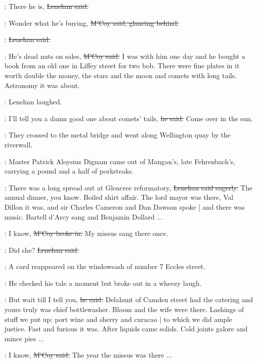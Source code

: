 \lenehan:
There he is,
\sout{Lenehan said.}

\mcoy:
Wonder what he's buying,
\sout{M'Coy said,
glancing behind.}

\lenehan:
\sout{Lenehan said.}

\mcoy:
He's dead nuts on sales,
\sout{M'Coy said.}
I was with him one day
and he bought a book 
from an old one in Liffey street for two bob.
There were fine plates in it worth double the money,
the stars and the moon and comets with long tails.
Astronomy it was about.

:
Lenehan laughed.

\lenehan:
I'll tell you a damn good one about comets' tails,
\sout{he said.}
Come over in the sun.

:
They crossed to the metal bridge
and went along Wellington quay by the riverwall.

\begin{mdframed}
    :
    Master Patrick Aloysius Dignam came out of Mangan's,
    late Fehrenbach's,
    carrying a pound and a half of porksteaks.
\end{mdframed}

\lenehan:
There was a long spread out at Glencree reformatory,
\sout{Lenehan said eagerly.}
The annual dinner, you know.
Boiled shirt affair.
The lord mayor was there,
Val Dillon it was,
and sir Charles Cameron and Dan Dawson spoke |
and there was music.
Bartell d'Arcy sang and Benjamin Dollard ...

\mcoy:
I know,
\sout{M'Coy broke in.}
My missus sang there once.

\lenehan:
Did she?
\sout{Lenehan said.}

\begin{mdframed}
    :
    A card  reappeared
    on the windowsash of number 7 Eccles street.
\end{mdframed}

:
He checked his tale a moment
but broke out in a wheezy laugh.

\lenehan:
But wait till I tell you,
\sout{he said.}
Delahunt of Camden street had the catering
and yours truly was chief bottlewasher.
Bloom and the wife were there.
Lashings of stuff we put up:
port wine and sherry and curacao |
to which we did ample justice.
Fast and furious it was.
After liquids came solids.
Cold joints galore and mince pies ...

\mcoy:
I know,
\sout{M'Coy said.}
The year the missus was there ...

